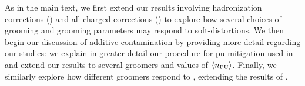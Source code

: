 \begin{subappendices}
As in the main text, we first extend our results involving \gls{hadronization} corrections () and all-charged corrections () to explore how several choices of grooming and grooming parameters may respond to \glspl{soft-distortion}.
%
We then begin our discussion of \gls{additive-contamination} by providing more detail regarding our  studies:
%
we explain in greater detail our procedure for \gls{pu-mitigation} used in  and extend our results to several groomers and values of \(\langle n_{\rm PU}\rangle\).
%
Finally, we similarly explore how different groomers respond to , extending the results of .


\begin{figure}[p]
    \centering
    \\
\end{figure}
\end{subappendices}
